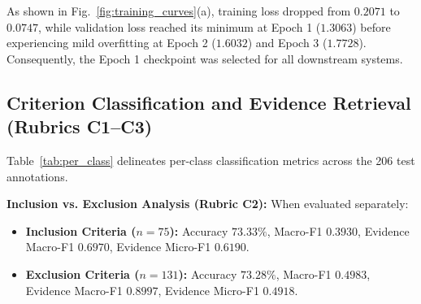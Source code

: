 \documentclass[conference]{IEEEtran}
\begin{document}
As shown in Fig.~\ref{fig:training_curves}(a), training loss dropped from $0.2071$ to $0.0747$, while validation loss reached its minimum at Epoch 1 ($1.3063$) before experiencing mild overfitting at Epoch 2 ($1.6032$) and Epoch 3 ($1.7728$). Consequently, the Epoch 1 checkpoint was selected for all downstream systems.

\subsection{Criterion Classification and Evidence Retrieval (Rubrics C1--C3)}
Table~\ref{tab:per_class} delineates per-class classification metrics across the 206 test annotations.

\begin{table}[htbp]
\caption{Detailed Classification Metrics on Held-Out Test Set ($n=206$)}
\label{tab:per_class}
\centering
{}
\end{table}

\textbf{Inclusion vs. Exclusion Analysis (Rubric C2):} When evaluated separately:
\begin{itemize}
    \item \textbf{Inclusion Criteria ($n=75$):} Accuracy $73.33\%$, Macro-F1 $0.3930$, Evidence Macro-F1 $0.6970$, Evidence Micro-F1 $0.6190$.
    \item \textbf{Exclusion Criteria ($n=131$):} Accuracy $73.28\%$, Macro-F1 $0.4983$, Evidence Macro-F1 $0.8997$, Evidence Micro-F1 $0.4918$.
\end{itemize}
\end{document}
